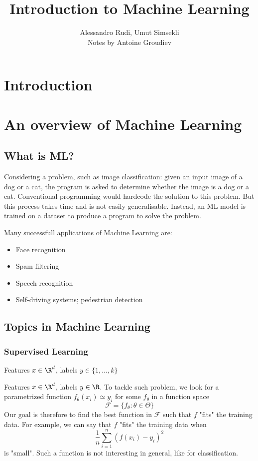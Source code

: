 \documentclass[toc]{../cs-classes/cs-classes}
\title{Introduction to Machine Learning}
\author{Alessandro Rudi, Umut Simsekli\\ Notes by Antoine Groudiev}
\begin{document}
\section*{Introduction}

\section{An overview of Machine Learning}
\subsection{What is ML?}
Considering a problem, such as image classification: given an input image of a dog or a cat, the program is asked to determine whether the image is a dog or a cat. Conventional programming would hardcode the solution to this problem. But this process takes time and is not easily generalisable. Instead, an ML model is trained on a dataset to produce a program to solve the problem.

Many successfull applications of Machine Learning are:
\begin{itemize}
    \item Face recognition
    \item Spam filtering
    \item Speech recognition
    \item Self-driving systems; pedestrian detection
\end{itemize}

\subsection{Topics in Machine Learning}
\subsubsection{Supervised Learning}
\begin{example}[Classification]
    Features $x\in\R^d$, labels $y\in\{1, \dots, k\}$
\end{example}

\begin{definition}[Regression]
    Features $x\in\R^d$, labels $y\in\R$. To tackle such problem, we look for a parametrized function $f_\theta(x_i)\simeq y_i$ for some $f_\theta$ in a function space
    \begin{equation*}
        \mathcal{F} = \{f_\theta : \theta\in\Theta\}
    \end{equation*}
    Our goal is therefore to find the best function in $\mathcal{F}$ such that $f$ "fits" the training data. For example, we can say that $f$ "fits" the training data when
    \begin{equation*}
        \frac{1}{n}\sum_{i=1}^n (f(x_i)-y_i)^2
    \end{equation*}
    is "small". Such a function is not interesting in general, like for classification. 
\end{definition}
\end{document}
